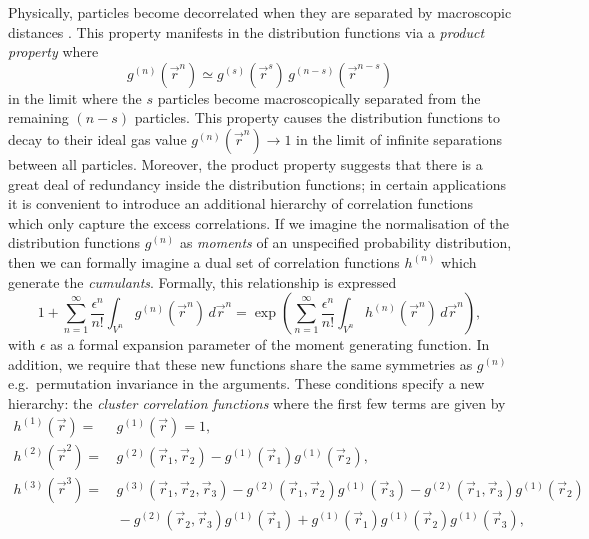 Physically, particles become decorrelated when they are separated by macroscopic distances%
.
This property manifests in the distribution functions via a \emph{product property} where \cite{UhlenbeckJMP1963}
\begin{equation*}
  g^{(n)}(\vec{r}^n)
  \simeq
  g^{(s)}(\vec{r}^s) \, g^{(n-s)}(\vec{r}^{n-s})
\end{equation*}
in the limit where the $s$ particles become macroscopically separated from the remaining $(n-s)$ particles.
This property causes the distribution functions to decay to their ideal gas value $g^{(n)}(\vec{r}^n) \to 1$ in the limit of infinite separations between all particles.
Moreover, the product property suggests that there is a great deal of redundancy inside the distribution functions; in certain applications it is convenient to introduce an additional hierarchy of correlation functions which only capture the excess correlations.
If we imagine the normalisation of the distribution functions $g^{(n)}$ as \emph{moments} of an unspecified probability distribution, then we can formally imagine a dual set of correlation functions $h^{(n)}$ which generate the \emph{cumulants}.
Formally, this relationship is expressed \cite{Santos2016}
\begin{equation*}\label{eq:correlation-moment-generating-function}
  1
  + \sum_{n=1}^\infty \frac{\epsilon^n}{n!}
  \int_{V^n} g^{(n)}(\vec{r}^n) \, d\vec{r}^n
  =
  \exp{
    \left(
    \sum_{n=1}^\infty \frac{\epsilon^n}{n!}
    \int_{V^n} h^{(n)}(\vec{r}^n) \, d\vec{r}^n
    \right)
  },
\end{equation*}
with $\epsilon$ as a formal expansion parameter of the moment generating function.
In addition, we require that these new functions share the same symmetries as $g^{(n)}$ e.g.\ permutation invariance in the arguments.
These conditions specify a new hierarchy: the \emph{cluster correlation functions}%
where the first few terms are given by \cite{UhlenbeckJMP1963}
\begin{subequations}
  \begin{align}
    h^{(1)}(\vec{r})
    =& \,
    g^{(1)}(\vec{r}) = 1,
    \\
    h^{(2)}(\vec{r}^2)
    =& \,
    g^{(2)}(\vec{r}_1, \vec{r}_2)
    - g^{(1)}(\vec{r}_1) g^{(1)}(\vec{r}_2),
    \label{eq:pair-cluster-correlation-function}
    \\
    h^{(3)}(\vec{r}^3)
    =& \,
    g^{(3)}(\vec{r}_1, \vec{r}_2, \vec{r}_3)
    - g^{(2)}(\vec{r}_1, \vec{r}_2) g^{(1)}(\vec{r}_3)
    - g^{(2)}(\vec{r}_1, \vec{r}_3) g^{(1)}(\vec{r}_2)
    \nonumber \\ & \,
    - g^{(2)}(\vec{r}_2, \vec{r}_3) g^{(1)}(\vec{r}_1)
    + g^{(1)}(\vec{r}_1) g^{(1)}(\vec{r}_2) g^{(1)}(\vec{r}_3),
  \end{align}
\end{subequations}
